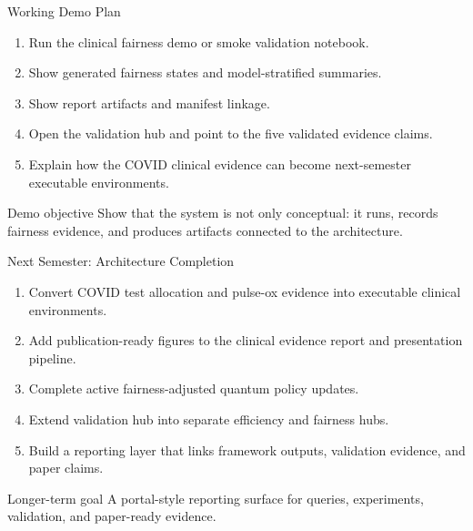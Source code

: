 \documentclass[aspectratio=169,10pt]{beamer}
\begin{document}
\begin{frame}{Working Demo Plan}
\begin{enumerate}
    \item Run the clinical fairness demo or smoke validation notebook.
    \item Show generated fairness states and model-stratified summaries.
    \item Show report artifacts and manifest linkage.
    \item Open the validation hub and point to the five validated evidence claims.
    \item Explain how the COVID clinical evidence can become next-semester executable environments.
\end{enumerate}

\vspace{0.6em}
\begin{block}{Demo objective}
Show that the system is not only conceptual: it runs, records fairness evidence, and produces artifacts connected to the architecture.
\end{block}
\end{frame}

\begin{frame}{Next Semester: Architecture Completion}
\begin{enumerate}
    \item Convert COVID test allocation and pulse-ox evidence into executable clinical environments.
    \item Add publication-ready figures to the clinical evidence report and presentation pipeline.
    \item Complete active fairness-adjusted quantum policy updates.
    \item Extend validation hub into separate efficiency and fairness hubs.
    \item Build a reporting layer that links framework outputs, validation evidence, and paper claims.
\end{enumerate}
\vspace{0.6em}
\begin{block}{Longer-term goal}
A portal-style reporting surface for queries, experiments, validation, and paper-ready evidence.
\end{block}
\end{frame}
\end{document}
